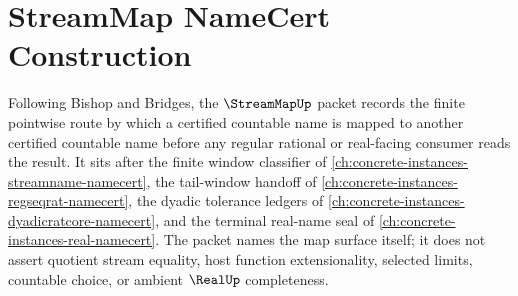 \chapter{StreamMap NameCert Construction}
\label{ch:concrete-instances-stream-map-namecert}

Following Bishop and Bridges, the $\StreamMapUp$ packet records the finite pointwise route by which a certified countable name is mapped to another certified countable name before any regular rational or real-facing consumer reads the result. It sits after the finite window classifier of \autoref{ch:concrete-instances-streamname-namecert}, the tail-window handoff of \autoref{ch:concrete-instances-regseqrat-namecert}, the dyadic tolerance ledgers of \autoref{ch:concrete-instances-dyadicratcore-namecert}, and the terminal real-name seal of \autoref{ch:concrete-instances-real-namecert}. The packet names the map surface itself; it does not assert quotient stream equality, host function extensionality, selected limits, countable choice, or ambient $\RealUp$ completeness.

